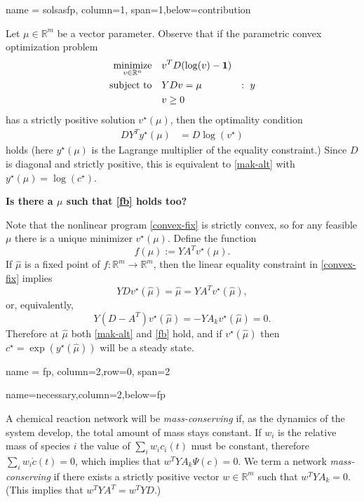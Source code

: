 \documentclass[landscape]{baposter}
\newcommand*{\0}{\mathbf{0}}
\newcommand*{\1}{\mathbf{1}}
\newcommand*{\minimize}{\text{minimize}}
\newcommand*{\st}{\text{subject to}}
\newcommand*{\R}{\mathbb{R}}
\begin{document}
\begin{poster}
 {
 name = solsasfp, column=1, span=1,below=contribution
 } 
 {
 Let $\mu \in \R^m$ be a vector parameter.  Observe that if the parametric
convex optimization problem
\begin{align}
   \underset{v\in\R^n}{\minimize} &\quad v^TD(\log(v)-\1)    \notag
\\                     \st &\quad YD v = \mu  &:\ y \label{convex-fix}
\\                         &\quad v \ge 0                     \notag
\end{align}
has a strictly positive solution $v^\star(\mu)$, then the optimality condition
\begin{align}
   DY^T y^\star(\mu) &= D\log(v^\star)  \label{optcon}
 \end{align} 
 holds (here $y^\star(\mu)$ is the Lagrange multiplier of the equality
 constraint.)  Since $D$ is diagonal and strictly positive, this is equivalent
 to \eqref{mak-alt} with $y^\star(\mu)=\log(c^\star)$.


{\bf Is there a $\mu$ such that \eqref{fb} holds too?}

Note that the nonlinear program \eqref{convex-fix} is strictly convex, so for any
feasible $\mu$ there is a unique minimizer $v^\star(\mu).$
Define the function 
\begin{equation}  \label{mapping}
	 f(\mu) := YA^Tv^\star(\mu).  \end{equation}
If $\hat\mu$ is a fixed point of $f: \R^m \rightarrow \R^m$, then the linear
equality constraint in \eqref{convex-fix} implies
\[
   YDv^\star(\hat\mu) = \hat\mu = YA^Tv^\star(\hat\mu),
\]
or, equivalently,
\[
   Y(D-A^T)v^\star(\hat\mu) = -Y A_k v^\star(\hat\mu) = 0.
\]
Therefore at $\hat\mu$ both \eqref{mak-alt} and \eqref{fb} hold, and if
$v^\star(\hat\mu)$ then $c^\star = \exp(y^\star(\hat\mu))$ will be 
a steady state.
 }

 {
 name = fp, column=2,row=0, span=2
 }
 {
 }

 {
 name=necessary,column=2,below=fp
 }
 {
 A chemical reaction network will be {\em mass-conserving} if, as the dynamics
 of the system develop, the total amount of mass stays constant. If $w_i$ is
 the relative mass of species $i$ the value of $\sum_i w_i c_i(t)$ must be
 constant, therefore $\sum_i w_i \dot c(t) = 0$, which implies that
 $w^TYA_k\Psi(c)=0$. We term a network {\em mass-conserving} if there
 exists a strictly positive vector $w\in\R^m$ such that $w^TYA_k = 0$.
(This implies that $w^TYA^T = w^TYD$.)

}
\end{poster}
\end{document}
